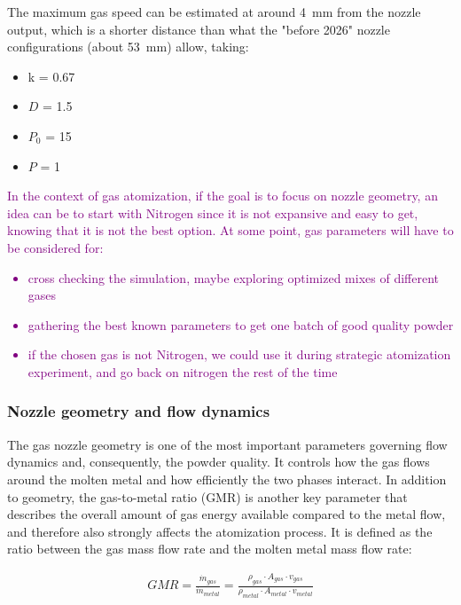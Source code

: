 \documentclass[../main]{subfiles}
\begin{document}
The maximum gas speed can be estimated at around 4~mm from the nozzle output, which is a shorter distance than what the "before 2026" nozzle configurations (about 53~mm) allow, taking:
\begin{itemize}
    \item k = 0.67~\cite{Ashkenas1965StructureUtilization}
    \item $D$ = 1.5
    \item $P_0$ = 15
    \item $P$ = 1
\end{itemize}


\textcolor{Purple}{In the context of gas atomization, if the goal is to focus on nozzle geometry, an idea can be to start with Nitrogen since it is not expansive and easy to get, knowing that it is not the best option. At some point, gas parameters will have to be considered for:
\begin{itemize}
    \item cross checking the simulation, maybe exploring optimized mixes of different gases 
    \item gathering the best known parameters to get one batch of good quality powder
    \item if the chosen gas is not Nitrogen, we could use it during strategic atomization experiment, and go back on nitrogen the rest of the time 
\end{itemize}}


\subsubsection{Nozzle geometry and flow dynamics}

The gas nozzle geometry is one of the most important parameters governing flow dynamics and, consequently, the powder quality. It controls how the gas flows around the molten metal and how efficiently the two phases interact. In addition to geometry, the gas-to-metal ratio (GMR) is another key parameter that describes the overall amount of gas energy available compared to the metal flow, and therefore also strongly affects the atomization process. It is defined as the ratio between the gas mass flow rate and the molten metal mass flow rate:

\vspace{0mm}
\begin{equation}
\begin{aligned}
GMR = \frac{\dot{m}_{gas}}{\dot{m}_{metal}} = \frac{\rho_{gas} \cdot A_{gas} \cdot v_{gas}}{\rho_{metal} \cdot A_{metal} \cdot v_{metal}}
\label{eq:GMR}
\end{aligned}
\end{equation}
\vspace{0mm}
\end{document}
